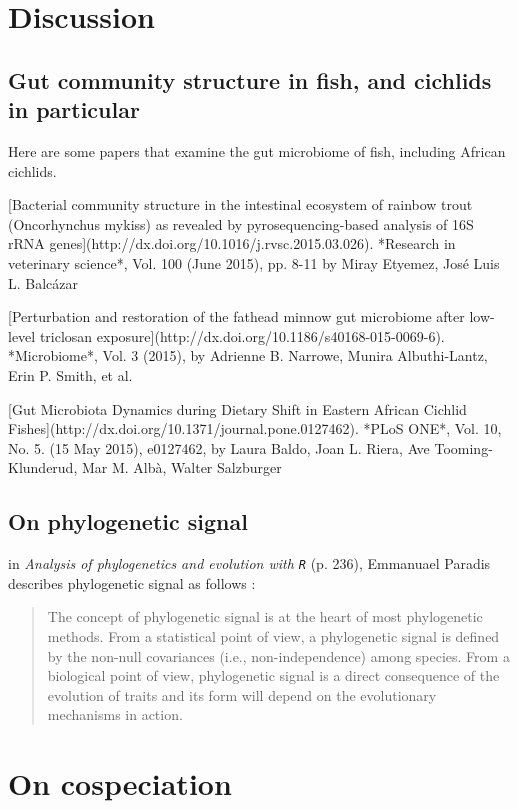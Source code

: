 \section{Discussion}

\subsection{Gut community structure in fish, and cichlids in particular}

Here are some papers that examine the gut microbiome of fish, including African cichlids.

[Bacterial community structure in the intestinal ecosystem of rainbow trout (Oncorhynchus mykiss) as revealed by pyrosequencing-based analysis of 16S rRNA genes](http://dx.doi.org/10.1016/j.rvsc.2015.03.026). *Research in veterinary science*, Vol. 100 (June 2015), pp. 8-11 by Miray Etyemez, José Luis L. Balcázar

[Perturbation and restoration of the fathead minnow gut microbiome after low-level triclosan exposure](http://dx.doi.org/10.1186/s40168-015-0069-6). *Microbiome*, Vol. 3 (2015), by Adrienne B. Narrowe, Munira Albuthi-Lantz, Erin P. Smith, et al.

[Gut Microbiota Dynamics during Dietary Shift in Eastern African Cichlid Fishes](http://dx.doi.org/10.1371/journal.pone.0127462). *PLoS ONE*, Vol. 10, No. 5. (15 May 2015), e0127462, by Laura Baldo, Joan L. Riera, Ave Tooming-Klunderud, Mar M. Albà, Walter Salzburger


\subsection{On phylogenetic signal}

in {\em Analysis of phylogenetics and evolution with {\tt R}} (p. 236), Emmanuael Paradis describes phylogenetic signal as follows :

\begin{quote}
The concept of phylogenetic signal is at the heart of most phylogenetic methods. From a statistical point of view, a phylogenetic signal is  defined by the non-null covariances (i.e., non-independence) among species. From a biological point of view, phylogenetic signal is a direct consequence of the evolution of traits and its form will depend on the evolutionary mechanisms in action.
\end{quote}

\section{On cospeciation}

